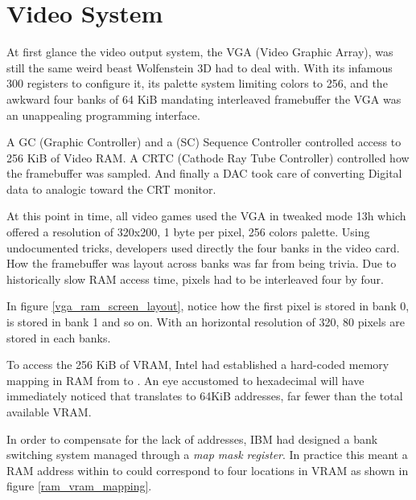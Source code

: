 \section{Video System}
At first glance the video output system, the VGA (Video Graphic Array), was still the same weird beast Wolfenstein 3D had to deal with. With its infamous 300 registers to configure it, its palette system limiting colors to 256, and the awkward four banks of 64 KiB mandating interleaved framebuffer the VGA was an unappealing programming interface.\\
\par
A GC (Graphic Controller) and a (SC) Sequence Controller controlled access to 256 KiB of Video RAM. A CRTC (Cathode Ray Tube Controller) controlled how the framebuffer was sampled. And finally a DAC took care of converting Digital data to analogic toward the CRT monitor.\\
\par 	
{}
\par
At this point in time, all video games used the VGA in tweaked mode 13h which offered a resolution of 320x200, 1 byte per pixel, 256 colors palette. Using undocumented tricks, developers used directly the four banks in the video card. How the framebuffer was layout across banks was far from being trivia. Due to historically slow RAM access time, pixels had to be interleaved four by four.\\
\par
\par
{}
\par
In figure \ref{vga_ram_screen_layout}, notice how the first pixel  is stored in bank 0,  is stored in bank 1 and so on. With an horizontal resolution of 320, 80 pixels are stored in each banks.\\
\par
To access the 256 KiB of VRAM, Intel had established a hard-coded memory mapping in RAM from  to . An eye accustomed to hexadecimal will have immediately noticed that  translates to 64KiB addresses, far fewer than the total available VRAM.\\
\par
 In order to compensate for the lack of addresses, IBM had designed a bank switching system managed through a \textit{map mask register}. In practice this meant a RAM address within  to  could correspond to four locations in VRAM as shown in figure \ref{ram_vram_mapping}.\\


